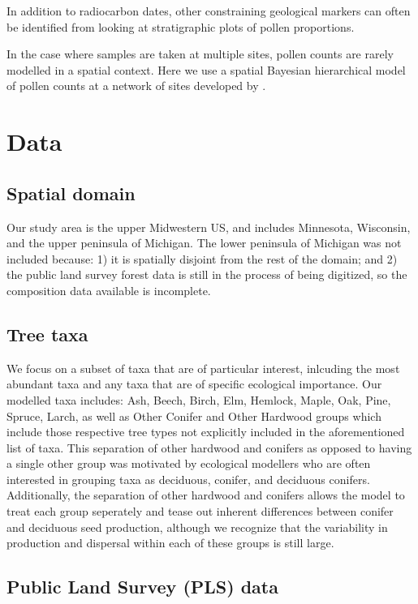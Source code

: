 \documentclass[12pt]{article}
\begin{document}
In addition to radiocarbon dates, other constraining geological
markers can often be identified from looking at stratigraphic plots of
pollen proportions.


In the case where samples are taken at multiple sites, pollen counts
are rarely modelled in a spatial context. Here we use a spatial
Bayesian hierarchical model of pollen counts at a network of sites
developed by \cite{XXX}.


\section{Data}

\subsection{Spatial domain}
Our study area is the upper Midwestern US, and includes Minnesota,
Wisconsin, and the upper peninsula of Michigan. The lower peninsula of
Michigan was not included because: 1) it is spatially disjoint from
the rest of the domain; and 2) the public land survey forest data is
still in the process of being digitized, so the composition data
available is incomplete.

\subsection{Tree taxa}
We focus on a subset of taxa that are of particular interest,
inlcuding the most abundant taxa and any taxa that are of specific
ecological importance. Our modelled taxa includes: Ash, Beech, Birch,
Elm, Hemlock, Maple, Oak, Pine, Spruce, Larch, as well as Other
Conifer and Other Hardwood groups which include those respective tree
types not explicitly included in the aforementioned list of taxa. This
separation of other hardwood and conifers as opposed to having a
single other group was motivated by ecological modellers who are often
interested in grouping taxa as deciduous, conifer, and deciduous
conifers. Additionally, the separation of other hardwood and conifers
allows the model to treat each group seperately and tease out inherent
differences between conifer and deciduous seed production, although we
recognize that the variability in production and dispersal within each
of these groups is still large.

\subsection{Public Land Survey (PLS) data}
\end{document}
